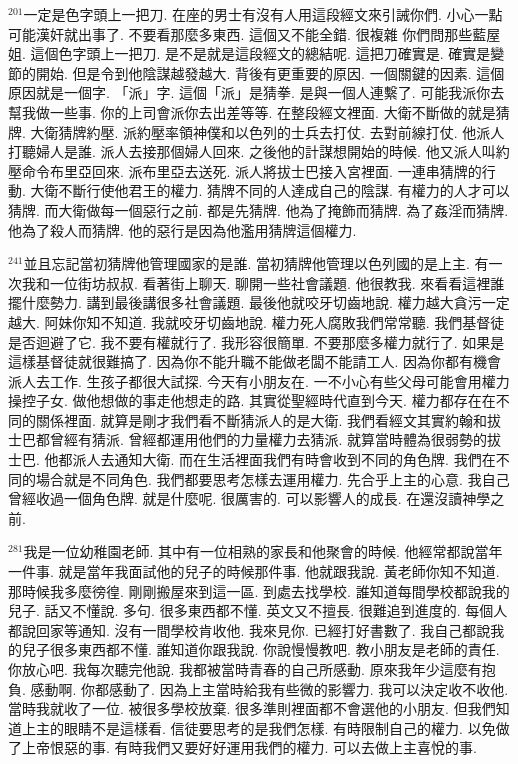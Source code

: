 \documentclass{book}
\begin{document}
$^{201}$一定是色字頭上一把刀.
在座的男士有沒有人用這段經文來引誡你們.
小心一點 可能漢奸就出事了.
不要看那麼多東西.
這個又不能全錯.
很複雜 你們問那些藍屋姐.
這個色字頭上一把刀.
是不是就是這段經文的總結呢.
這把刀確實是.
確實是變節的開始.
但是令到他陰謀越發越大.
背後有更重要的原因.
一個關鍵的因素.
這個原因就是一個字.
「派」字.
這個「派」是猜拳.
是與一個人連繫了.
可能我派你去幫我做一些事.
你的上司會派你去出差等等.
在整段經文裡面.
大衛不斷做的就是猜牌.
大衛猜牌約壓.
派約壓率領神僕和以色列的士兵去打仗.
去對前線打仗.
他派人打聽婦人是誰.
派人去接那個婦人回來.
之後他的計謀想開始的時候.
他又派人叫約壓命令布里亞回來.
派布里亞去送死.
派人將拔士巴接入宮裡面.
一連串猜牌的行動.
大衛不斷行使他君王的權力.
猜牌不同的人達成自己的陰謀.
有權力的人才可以猜牌.
而大衛做每一個惡行之前.
都是先猜牌.
他為了掩飾而猜牌.
為了姦淫而猜牌.
他為了殺人而猜牌.
他的惡行是因為他濫用猜牌這個權力.

$^{241}$並且忘記當初猜牌他管理國家的是誰.
當初猜牌他管理以色列國的是上主.
有一次我和一位街坊叔叔.
看著街上聊天.
聊開一些社會議題.
他很教我.
來看看這裡誰擺什麼勢力.
講到最後講很多社會議題.
最後他就咬牙切齒地說.
權力越大貪污一定越大.
阿妹你知不知道.
我就咬牙切齒地說.
權力死人腐敗我們常常聽.
我們基督徒是否迴避了它.
我不要有權就行了.
我形容很簡單.
不要那麼多權力就行了.
如果是這樣基督徒就很難搞了.
因為你不能升職不能做老闆不能請工人.
因為你都有機會派人去工作.
生孩子都很大試探.
今天有小朋友在.
一不小心有些父母可能會用權力操控子女.
做他想做的事走他想走的路.
其實從聖經時代直到今天.
權力都存在在不同的關係裡面.
就算是剛才我們看不斷猜派人的是大衛.
我們看經文其實約翰和拔士巴都曾經有猜派.
曾經都運用他們的力量權力去猜派.
就算當時體為很弱勢的拔士巴.
他都派人去通知大衛.
而在生活裡面我們有時會收到不同的角色牌.
我們在不同的場合就是不同角色.
我們都要思考怎樣去運用權力.
先合乎上主的心意.
我自己曾經收過一個角色牌.
就是什麼呢.
很厲害的.
可以影響人的成長.
在還沒讀神學之前.

$^{281}$我是一位幼稚園老師.
其中有一位相熟的家長和他聚會的時候.
他經常都說當年一件事.
就是當年我面試他的兒子的時候那件事.
他就跟我說.
黃老師你知不知道.
那時候我多麼徬徨.
剛剛搬屋來到這一區.
到處去找學校.
誰知道每間學校都說我的兒子.
話又不懂說.
多句.
很多東西都不懂.
英文又不擅長.
很難追到進度的.
每個人都說回家等通知.
沒有一間學校肯收他.
我來見你.
已經打好書數了.
我自己都說我的兒子很多東西都不懂.
誰知道你跟我說.
你說慢慢教吧.
教小朋友是老師的責任.
你放心吧.
我每次聽完他說.
我都被當時青春的自己所感動.
原來我年少這麼有抱負.
感動啊.
你都感動了.
因為上主當時給我有些微的影響力.
我可以決定收不收他.
當時我就收了一位.
被很多學校放棄.
很多準則裡面都不會選他的小朋友.
但我們知道上主的眼睛不是這樣看.
信徒要思考的是我們怎樣.
有時限制自己的權力.
以免做了上帝恨惡的事.
有時我們又要好好運用我們的權力.
可以去做上主喜悅的事.
\end{document}
